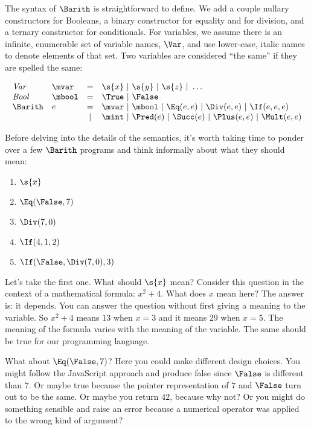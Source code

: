 The syntax of $\Barith$ is straightforward to define.  We add a couple
nullary constructors for Booleans, a binary constructor for equality
and for division, and a ternary constructor for conditionals.  For
variables, we assume there is an infinite, enumerable set of variable
names, $\Var$, and use lower-case, italic names to denote elements of
that set.  Two variables are considered ``the same'' if they are
spelled the same:

\[
\begin{array}{llcl}
\mathit{Var} & \mvar & = & \s{x}\ |\ \s{y}\ |\ \s{z}\ |\ \dots \\
\mathit{Bool} & \mbool & = & \True\ |\ \False\\
\Barith & e & = & \mvar\ |\ \mbool\ |\ \Eq(e,e)\ |\ \Div(e,e)\ |\ \If(e,e,e)\\
        &   & | & \mint\ |\ \Pred(e)\ |\ \Succ(e)\ |\ \Plus(e,e)\ |\ \Mult(e,e)
\end{array}
\]



Before delving into the details of the semantics, it's worth taking
time to ponder over a few $\Barith$ programs and think informally
about what they should mean:

\begin{enumerate}\setlength{\itemsep}{0pt}
\item $\s{x}$
\item $\Eq(\False,7)$
\item $\Div(7,0)$
\item $\If(4,1,2)$
\item $\If(\False,\Div(7,0),3)$
\end{enumerate}

Let's take the first one.  What should $\s{x}$ mean?  Consider this
question in the context of a mathematical formula: $x^2+4$.  What does
$x$ mean here?  The answer is: it depends.  You can answer the
question without first giving a meaning to the variable.  So $x^2+4$
means $13$ when $x=3$ and it means $29$ when $x=5$.  The meaning of
the formula varies with the meaning of the variable.  The same should
be true for our programming language.

What about $\Eq(\False,7)$?  Here you could make different design
choices.  You might follow the JavaScript approach and produce false
since $\False$ is different than $7$.  Or maybe true because the
pointer representation of $7$ and $\False$ turn out to be the same.
Or maybe you return $42$, because why not?  Or you might do something
sensible and raise an error because a numerical operator was applied
to the wrong kind of argument?

